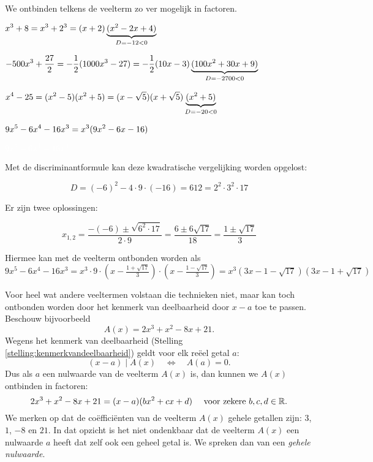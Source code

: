 \documentclass{ximera}
\begin{document}
\begin{example} 
We ontbinden telkens de veelterm zo ver mogelijk in factoren. 

\begin{question} \( \displaystyle x^3 + 8 = x^3 + 2^3 = (x+2)\underbrace{(x^2-2x+4)}_{D = -12 < 0}                                                         \) \end{question}
\begin{question} \( \displaystyle -500x^3 + \frac{27}{2} = -\frac{1}{2}(1000x^3 - 27) = -\frac{1}{2}(10x-3)\underbrace{(100x^2 + 30x + 9)}_{D = -2700 < 0} \) \end{question}
\begin{question} \( \displaystyle x^4-25 = (x^2 - 5)(x^2+5) = (x-\sqrt{5})(x+\sqrt{5})\underbrace{(x^2+5)}_{D = -20 < 0}                                   \) \end{question}
\begin{question} \( \displaystyle 9x^5 - 6x^4 - 16x^3 = x^3(9x^2-6x-16)                                                                                    \) \end{question}
\begin{question} \( \D \mph{9x^5 - 6x^4 - 16x^3} \)              

Met de discriminantformule kan deze kwadratische vergelijking worden opgelost: 

\[
D = (-6)^2-4\cdot 9 \cdot (-16) = 612 = 2^2 \cdot 3^2 \cdot 17 
\]

Er zijn twee oplossingen: 

\[
x_{1,2} = \frac{-(-6) \pm \sqrt{6^2 \cdot 17}}{2 \cdot 9} = \frac{6 \pm 6\sqrt{17}}{18} = \frac{1 \pm \sqrt{17}}{3} 
\]

Hiermee kan met de veelterm ontbonden worden als \(9x^5 - 6x^4 - 16x^3 = x^3 \cdot 9 \cdot \left(x-\frac{1+\sqrt{17}}{3}\right)\cdot\left(x-\frac{1-\sqrt{17}}{3}\right) = x^3(3x-1-\sqrt{17})(3x-1+\sqrt{17})\)

\end{question}
\end{example} 

Voor heel wat andere veeltermen volstaan die technieken niet, maar kan toch ontbonden worden door het kenmerk van deelbaarheid door $x-a$ toe te passen. Beschouw bijvoorbeeld
\[
A(x) = 2x^3 +x^2 - 8x + 21.
\]
Wegens het kenmerk van deelbaarheid (Stelling \ref{stelling:kenmerkvandeelbaarheid}) geldt voor elk reëel getal $a$: 
\[
(x-a) \mid A(x) \quad \Leftrightarrow \quad A(a) = 0. 
\]
Dus als $a$ een nulwaarde van de veelterm $A(x)$ is, dan kunnen we $A(x)$ ontbinden in factoren:
\[
2x^3 +x^2 - 8x + 21 = (x-a)(bx^2 + cx + d) %
\quad 
\text{ voor zekere } b,c,d \in \R.
\]
We merken op dat de coëfficiënten van de veelterm $A(x)$ gehele getallen zijn: $3$, $1$, $-8$ en $21$. In dat opzicht is het niet ondenkbaar dat de veelterm $A(x)$ een nulwaarde $a$ heeft dat zelf ook een geheel getal is. We spreken dan van een \textit{ gehele nulwaarde}.
\end{document}
